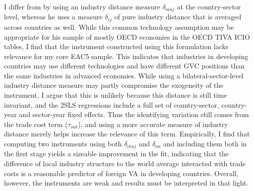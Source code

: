 \documentclass[a4paper]{article}
\begin{document}
I differ from \citet{Kummritz20161} by using an industry distance measure $\delta_{oiuj}$ at the country-sector level, whereas he uses a measure $\delta_{ij}$ of pure industry distance that is averaged across countries as well. While this common technology assumption may be appropriate for his sample of mostly OECD economies in the OECD TIVA ICIO tables, I find that the instrument constructed using this formulation lacks relevance for my core EAC5 sample. This indicates that industries in developing countries may use different technologies and have different GVC positions than the same industries in advanced economies. While using a bilateral-sector-level industry distance measure may partly compromise the exogeneity of the instrument, I argue that this is unlikely because this distance is still time invariant, and the 2SLS regressions include a full set of country-sector, country-year and sector-year fixed effects. Thus the identifying variation still comes from the trade cost term ($\tau_{out}$), and using a more accurate measure of industry distance merely helps increase the relevance of this term. Empirically, I find that computing two instruments using both $\delta_{oiuj}$ and $\delta_{ou}$ and including them both in the first stage yields a sizeable improvement in the fit, indicating that the difference of local industry structure to the world average interacted with trade costs is a reasonable predictor of foreign VA in developing countries. Overall, however, the instruments are weak and results must be interpreted in that light.  \newline
\end{document}
